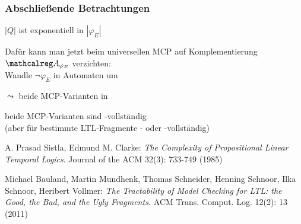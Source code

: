     \begin{frame}
      \frametitle{Abschließende Betrachtungen}

      \begin{Itemize}
        \item
          $|Q|$ ist exponentiell in $|\varphi_E|$
          \par\smallskip
        \item
          Dafür kann man jetzt beim universellen MCP auf Komplementierung $\Aut{A}_{\varphi_E}$ verzichten:\\
          Wandle $\neg\varphi_E$ in Automaten um
          \par\smallskip
        \item[$\leadsto$]
          beide MCP-Varianten in \PSPACE
          \par\smallskip
        \item
          beide MCP-Varianten sind \PSPACE-vollständig\\
          (aber für bestimmte LTL-Fragmente \NP- oder \NL-vollständig)
          \par\medskip
          \begin{footnotesize}
            A. Prasad Sistla, Edmund M. Clarke:
            \emph{The Complexity of Propositional Linear Temporal Logics}.
            Journal of the ACM 32(3): 733-749 (1985)
            \par\medskip
            Michael Bauland, Martin Mundhenk, Thomas Schneider, Henning Schnoor, Ilka Schnoor, Heribert Vollmer:
            \emph{The Tractability of Model Checking for LTL: the Good, the Bad, and the Ugly Fragments.}
            ACM Trans. Comput. Log. 12(2): 13 (2011)
            \par
          \end{footnotesize}
      \end{Itemize}

    \end{frame}

% 
% 


% 

    

